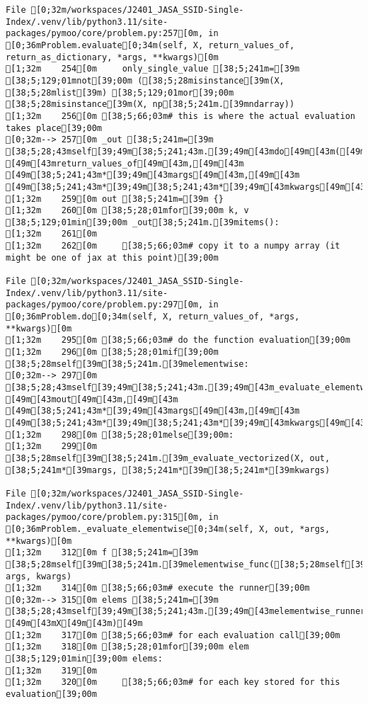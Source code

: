 \documentclass[
  letterpaper,
  DIV=11,
  numbers=noendperiod]{scrartcl}
\begin{document}
\begin{verbatim}
File [0;32m/workspaces/J2401_JASA_SSID-Single-Index/.venv/lib/python3.11/site-packages/pymoo/core/problem.py:257[0m, in [0;36mProblem.evaluate[0;34m(self, X, return_values_of, return_as_dictionary, *args, **kwargs)[0m
[1;32m    254[0m     only_single_value [38;5;241m=[39m [38;5;129;01mnot[39;00m ([38;5;28misinstance[39m(X, [38;5;28mlist[39m) [38;5;129;01mor[39;00m [38;5;28misinstance[39m(X, np[38;5;241m.[39mndarray))
[1;32m    256[0m [38;5;66;03m# this is where the actual evaluation takes place[39;00m
[0;32m--> 257[0m _out [38;5;241m=[39m [38;5;28;43mself[39;49m[38;5;241;43m.[39;49m[43mdo[49m[43m([49m[43mX[49m[43m,[49m[43m [49m[43mreturn_values_of[49m[43m,[49m[43m [49m[38;5;241;43m*[39;49m[43margs[49m[43m,[49m[43m [49m[38;5;241;43m*[39;49m[38;5;241;43m*[39;49m[43mkwargs[49m[43m)[49m
[1;32m    259[0m out [38;5;241m=[39m {}
[1;32m    260[0m [38;5;28;01mfor[39;00m k, v [38;5;129;01min[39;00m _out[38;5;241m.[39mitems():
[1;32m    261[0m 
[1;32m    262[0m     [38;5;66;03m# copy it to a numpy array (it might be one of jax at this point)[39;00m

File [0;32m/workspaces/J2401_JASA_SSID-Single-Index/.venv/lib/python3.11/site-packages/pymoo/core/problem.py:297[0m, in [0;36mProblem.do[0;34m(self, X, return_values_of, *args, **kwargs)[0m
[1;32m    295[0m [38;5;66;03m# do the function evaluation[39;00m
[1;32m    296[0m [38;5;28;01mif[39;00m [38;5;28mself[39m[38;5;241m.[39melementwise:
[0;32m--> 297[0m     [38;5;28;43mself[39;49m[38;5;241;43m.[39;49m[43m_evaluate_elementwise[49m[43m([49m[43mX[49m[43m,[49m[43m [49m[43mout[49m[43m,[49m[43m [49m[38;5;241;43m*[39;49m[43margs[49m[43m,[49m[43m [49m[38;5;241;43m*[39;49m[38;5;241;43m*[39;49m[43mkwargs[49m[43m)[49m
[1;32m    298[0m [38;5;28;01melse[39;00m:
[1;32m    299[0m     [38;5;28mself[39m[38;5;241m.[39m_evaluate_vectorized(X, out, [38;5;241m*[39margs, [38;5;241m*[39m[38;5;241m*[39mkwargs)

File [0;32m/workspaces/J2401_JASA_SSID-Single-Index/.venv/lib/python3.11/site-packages/pymoo/core/problem.py:315[0m, in [0;36mProblem._evaluate_elementwise[0;34m(self, X, out, *args, **kwargs)[0m
[1;32m    312[0m f [38;5;241m=[39m [38;5;28mself[39m[38;5;241m.[39melementwise_func([38;5;28mself[39m, args, kwargs)
[1;32m    314[0m [38;5;66;03m# execute the runner[39;00m
[0;32m--> 315[0m elems [38;5;241m=[39m [38;5;28;43mself[39;49m[38;5;241;43m.[39;49m[43melementwise_runner[49m[43m([49m[43mf[49m[43m,[49m[43m [49m[43mX[49m[43m)[49m
[1;32m    317[0m [38;5;66;03m# for each evaluation call[39;00m
[1;32m    318[0m [38;5;28;01mfor[39;00m elem [38;5;129;01min[39;00m elems:
[1;32m    319[0m 
[1;32m    320[0m     [38;5;66;03m# for each key stored for this evaluation[39;00m


\end{verbatim}
\end{document}
